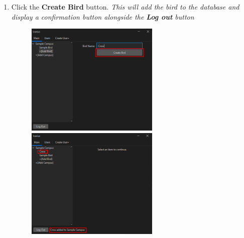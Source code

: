 \begin{enumerate}
    \item Click the \textbf{Create Bird} button. \textit{This will add the bird to the database and display a confirmation button alongside the \textbf{Log out} button}
    \begin{figure}[H]
        \centering
        \includegraphics[width=0.6\textwidth]{MainTab/AddBird/addBirdCreate.PNG}
        \includegraphics[width=0.6\textwidth]{MainTab/AddBird/addBirdCreated.PNG}
    \end{figure}
\end{enumerate}

